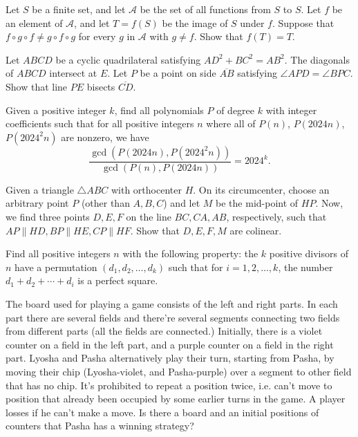 \documentclass[11pt]{scrartcl}
\begin{document}
\begin{problem}[284766145954043]
Let $S$ be a finite set, and let $\mathcal{A}$ be the set of all functions from $S$ to $S$. Let $f$ be an element of $\mathcal{A}$, and let $T=f(S)$ be the image of $S$ under $f$. Suppose that $f\circ g\circ f\ne g\circ f\circ g$ for every $g$ in $\mathcal{A}$ with $g\ne f$. Show that $f(T)=T$.
\end{problem}
\begin{problem}[287986230573307]
Let $ABCD$ be a cyclic quadrilateral satisfying $AD^2 + BC^2 = AB^2$. The diagonals of $ABCD$ intersect at $E$. Let $P$ be a point on side $\overline{AB}$ satisfying $\angle APD = \angle BPC$. Show that line $PE$ bisects $\overline{CD}$.
\end{problem}
\begin{problem}[291724488494808]
Given a positive integer $k$, find all polynomials $P$ of degree $k$ with integer coefficients such that for all positive integers $n$ where all of $P(n)$, $P(2024n)$, $P(2024^2n)$ are nonzero, we have
$$\frac{\gcd(P(2024n), P(2024^2n))}{\gcd(P(n), P(2024n))}=2024^k.$$
\end{problem}
\begin{problem}[296367141382799]
Given a triangle $ \triangle{ABC} $ with orthocenter $ H $. On its circumcenter, choose an arbitrary point $ P $ (other than $ A,B,C $) and let $ M $ be the mid-point of $ HP $. Now, we find three points $ D,E,F $ on the line $ BC, CA, AB $, respectively, such that $ AP \parallel HD, BP \parallel HE, CP \parallel HF $. Show that $ D, E, F, M $ are colinear.
\end{problem}
\begin{problem}[297274918587198]
	Find all positive integers $n$ with the following property: the $k$ positive divisors of $n$ have a permutation $(d_1,d_2,\ldots,d_k)$ such that for $i=1,2,\ldots,k$, the number $d_1+d_2+\cdots+d_i$ is a perfect square.
\end{problem}
\begin{problem}[297728211754501]
The board used for playing a game consists of the left and right parts. In each part there are several fields and there’re several segments connecting two fields from different parts (all the fields are connected.) Initially, there is a violet counter on a field in the left part, and a purple counter on a field in the right part. Lyosha and Pasha alternatively play their turn, starting from Pasha, by moving their chip (Lyosha-violet, and Pasha-purple) over a segment to other field that has no chip. It’s prohibited to repeat a position twice, i.e. can’t move to position that already been occupied by some earlier turns in the game. A player losses if he can’t make a move. Is there a board and an initial positions of counters that Pasha has a winning strategy?
\end{problem}
\end{document}
